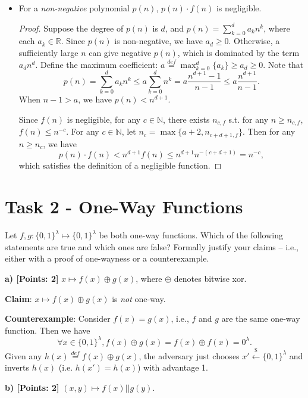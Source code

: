 \documentclass[12pt]{article}
\newcommand{\eqdef}{\stackrel{def}{=}}
\newcommand{\N}{\mathbb{N}}
\newcommand{\R}{\mathbb{R}}
\newcommand{\bits}{\{0,1\}}
\newcommand{\getsr}{\stackrel{\$}{\gets}}
\theoremstyle{definition}
\begin{document}
\begin{itemize}
\item For a \emph{non-negative} polynomial $p(n)$, $p(n)\cdot f(n)$ is negligible.
\begin{proof}
Suppose the degree of $p(n)$ is $d$, and $p(n) = \sum_{k=0}^d a_kn^k$, where each $a_k\in\R$.
Since $p(n)$ is non-negative, we have $a_d \geq 0$. Otherwise, a sufficiently large $n$ can give negative $p(n)$, which is dominated by the term $a_dn^d$.
Define the maximum coefficient: $a \eqdef \max_{k=0}^d \{a_k\} \geq a_d \geq 0$. Note that 
$$p(n) = \sum_{k=0}^d a_kn^k \leq a \sum_{k=0}^d n^k = a \frac{n^{d+1}-1}{n-1} \leq a \frac{n^{d+1}}{n-1}.$$
When $n-1>a$, we have $p(n) < n^{d+1}$. 

Since $f(n)$ is negligible, for any $c\in\N$, there exists $n_{c,f}$ s.t. for any $n\geq n_{c,f}$, $f(n) \leq n^{-c}$. 
For any $c\in\N$, let $n_c = \max\{a+2, n_{c+d+1,f}\}$. Then for any $n\geq n_c$, we have
$$p(n)\cdot f(n) < n^{d+1} f(n) \leq n^{d+1} n^{-(c+d+1)} = n^{-c},$$
which satisfies the definition of a negligible function.
\end{proof}
\end{itemize}

\section{Task 2 - One-Way Functions}
Let $f, g : \bits^\lambda \mapsto \bits^\lambda$ be both one-way functions. Which of the following statements
are true and which ones are false? Formally justify your claims – i.e., either with a proof
of one-wayness or a counterexample.

{\bf a) [Points: 2]} $x \mapsto f(x) \oplus g(x)$, where $\oplus$ denotes bitwise xor.

{\bf Claim}: $x \mapsto f(x) \oplus g(x)$ is \emph{not} one-way.

{\bf Counterexample}:
Consider $f(x) = g(x)$, i.e., $f$ and $g$ are the same one-way function. Then we have
$$\forall x\in\bits^\lambda, f(x) \oplus g(x) = f(x) \oplus f(x) = 0^\lambda.$$
Given any $h(x) \eqdef f(x) \oplus g(x)$, the adversary just chooses $x' \getsr \bits^\lambda$ and inverts $h(x)$ (i.e. $h(x')=h(x)$) with advantage 1.

{\bf b) [Points: 2]} $(x, y) \mapsto f(x) || g(y)$.
\end{document}
